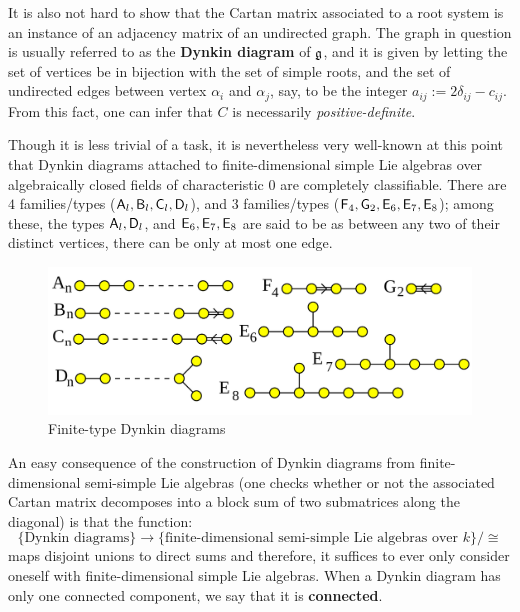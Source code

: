             \begin{remark}
                It is also not hard to show that the Cartan matrix associated to a root system is an instance of an adjacency matrix of an undirected graph. The graph in question is usually referred to as the \textbf{Dynkin diagram} of $\mathfrak{g}$, and it is given by letting the set of vertices be in bijection with the set of simple roots, and the set of undirected edges between vertex $\alpha_i$ and $\alpha_j$, say, to be the integer $a_{ij} := 2 \delta_{ij} - c_{ij}$. From this fact, one can infer that $C$ is necessarily \textit{positive-definite}.

                Though it is less trivial of a task, it is nevertheless very well-known at this point that Dynkin diagrams attached to finite-dimensional simple Lie algebras over algebraically closed fields of characteristic $0$ are completely classifiable. There are $4$  families/types ($\mathsf{A}_l, \mathsf{B}_l, \mathsf{C}_l, \mathsf{D}_l$), and $3$  families/types ($\mathsf{F}_4, \mathsf{G}_2, \mathsf{E}_6, \mathsf{E}_7, \mathsf{E}_8$); among these, the types $\mathsf{A}_l, \mathsf{D}_l$, and $\mathsf{E}_6, \mathsf{E}_7, \mathsf{E}_8$ are said to be  as between any two of their distinct vertices, there can be only at most one edge.
                \begin{figure}[H]
                    \centering
                    \includegraphics[width=0.5\linewidth]{finite_type_dynkin_diagrams.png}
                    \caption{Finite-type Dynkin diagrams}
                    \label{fig: finite_type_dynkin_diagrams}
                \end{figure}
                
                An easy consequence of the construction of Dynkin diagrams from finite-dimensional semi-simple Lie algebras (one checks whether or not the associated Cartan matrix decomposes into a block sum of two submatrices along the diagonal) is that the function:
                    $$\{ \text{Dynkin diagrams} \} \to \{ \text{finite-dimensional semi-simple Lie algebras over $k$} \}/\cong$$
                maps disjoint unions to direct sums and therefore, it suffices to ever only consider oneself with finite-dimensional simple Lie algebras. When a Dynkin diagram has only one connected component, we say that it is \textbf{connected}.
            \end{remark}
